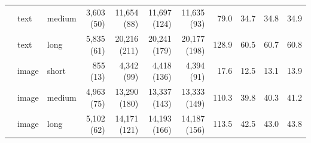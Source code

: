 \begin{table}[tp]
{\begin{tabular}{lll rrrr rrrr}
 & text & medium & 3{,}603 (50) & 11{,}654 (88) & 11{,}697 (124) & 11{,}635 (93) & 79.0 & 34.7 & 34.8 & 34.9 \\
 & text & long & 5{,}835 (61) & 20{,}216 (211) & 20{,}241 (179) & 20{,}177 (198) & 128.9 & 60.5 & 60.7 & 60.8 \\
 & image & short & 855 (13) & 4{,}342 (99) & 4{,}418 (136) & 4{,}394 (91) & 17.6 & 12.5 & 13.1 & 13.9 \\
 & image & medium & 4{,}963 (75) & 13{,}290 (180) & 13{,}337 (143) & 13{,}333 (149) & 110.3 & 39.8 & 40.3 & 41.2 \\
 & image & long & 5{,}102 (62) & 14{,}171 (121) & 14{,}193 (166) & 14{,}187 (156) & 113.5 & 42.5 & 43.0 & 43.8 \\
\bottomrule
\end{tabular}}
\end{table}
